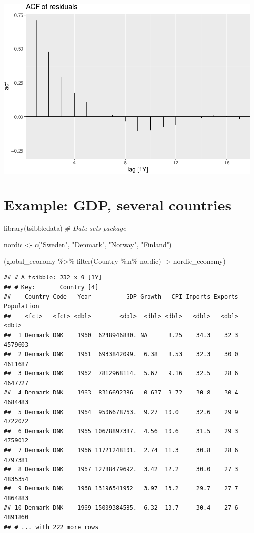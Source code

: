 \documentclass[
]{book}
\newenvironment{Shaded}{\begin{snugshade}}{\end{snugshade}}
\newcommand{\CommentTok}[1]{\textcolor[rgb]{0.56,0.35,0.01}{\textit{#1}}}
\newcommand{\FunctionTok}[1]{\textcolor[rgb]{0.00,0.00,0.00}{#1}}
\newcommand{\NormalTok}[1]{#1}
\newcommand{\OtherTok}[1]{\textcolor[rgb]{0.56,0.35,0.01}{#1}}
\newcommand{\SpecialCharTok}[1]{\textcolor[rgb]{0.00,0.00,0.00}{#1}}
\newcommand{\StringTok}[1]{\textcolor[rgb]{0.31,0.60,0.02}{#1}}
\begin{document}
\includegraphics{graphics/unnamed-chunk-38-1.pdf}

\hypertarget{example-gdp-several-countries}{%
\section{Example: GDP, several countries}\label{example-gdp-several-countries}}

\begin{Shaded}
\begin{Highlighting}[]
\FunctionTok{library}\NormalTok{(tsibbledata) }\CommentTok{\# Data sets package}

\NormalTok{nordic }\OtherTok{\textless{}{-}} \FunctionTok{c}\NormalTok{(}\StringTok{"Sweden"}\NormalTok{, }\StringTok{"Denmark"}\NormalTok{, }\StringTok{"Norway"}\NormalTok{, }\StringTok{"Finland"}\NormalTok{)}

\NormalTok{(global\_economy }\SpecialCharTok{\%\textgreater{}\%} \FunctionTok{filter}\NormalTok{(Country }\SpecialCharTok{\%in\%}\NormalTok{ nordic) }\OtherTok{{-}\textgreater{}}\NormalTok{ nordic\_economy)}
\end{Highlighting}
\end{Shaded}

\begin{verbatim}
## # A tsibble: 232 x 9 [1Y]
## # Key:       Country [4]
##    Country Code   Year          GDP Growth   CPI Imports Exports Population
##    <fct>   <fct> <dbl>        <dbl>  <dbl> <dbl>   <dbl>   <dbl>      <dbl>
##  1 Denmark DNK    1960  6248946880. NA      8.25    34.3    32.3    4579603
##  2 Denmark DNK    1961  6933842099.  6.38   8.53    32.3    30.0    4611687
##  3 Denmark DNK    1962  7812968114.  5.67   9.16    32.5    28.6    4647727
##  4 Denmark DNK    1963  8316692386.  0.637  9.72    30.8    30.4    4684483
##  5 Denmark DNK    1964  9506678763.  9.27  10.0     32.6    29.9    4722072
##  6 Denmark DNK    1965 10678897387.  4.56  10.6     31.5    29.3    4759012
##  7 Denmark DNK    1966 11721248101.  2.74  11.3     30.8    28.6    4797381
##  8 Denmark DNK    1967 12788479692.  3.42  12.2     30.0    27.3    4835354
##  9 Denmark DNK    1968 13196541952   3.97  13.2     29.7    27.7    4864883
## 10 Denmark DNK    1969 15009384585.  6.32  13.7     30.4    27.6    4891860
## # ... with 222 more rows
\end{verbatim}
\end{document}
